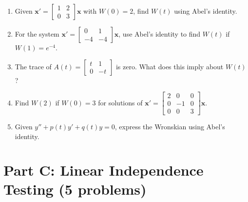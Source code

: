 \documentclass[12pt]{article}
\begin{document}
\begin{enumerate}[resume]
\item Given $\mathbf{x}' = \begin{bmatrix} 1 & 2 \\ 0 & 3 \end{bmatrix}\mathbf{x}$ with $W(0) = 2$, find $W(t)$ using Abel's identity.

\item For the system $\mathbf{x}' = \begin{bmatrix} 0 & 1 \\ -4 & -4 \end{bmatrix}\mathbf{x}$, use Abel's identity to find $W(t)$ if $W(1) = e^{-4}$.

\item The trace of $A(t) = \begin{bmatrix} t & 1 \\ 0 & -t \end{bmatrix}$ is zero. What does this imply about $W(t)$?

\item Find $W(2)$ if $W(0) = 3$ for solutions of $\mathbf{x}' = \begin{bmatrix} 2 & 0 & 0 \\ 0 & -1 & 0 \\ 0 & 0 & 3 \end{bmatrix}\mathbf{x}$.

\item Given $y'' + p(t)y' + q(t)y = 0$, express the Wronskian using Abel's identity.
\end{enumerate}

\section*{Part C: Linear Independence Testing (5 problems)}
\end{document}
